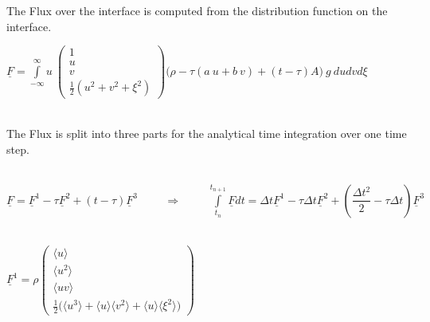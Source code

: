\documentclass[
	pdftex,             %
	12pt,				%
	a4paper,		   	%
	english,				%
	oneside,			%
]{article}
\newcommand{\mom}[1]{\langle #1 \rangle}
\newcommand{\uu}[1]{\underline{#1}}
\begin{document}
\clearpage

The Flux over the interface is computed from the distribution function on the interface. 

\begin{math}
\uu{F} = 
\int \limits_{-\infty}^{\infty}
u~
\begin{pmatrix}
	1 \\ u \\ v \\ \frac{1}{2} (u^2 + v^2 + \xi^2)
\end{pmatrix}
\Big(
	\rho - \tau (a~u + b~v) + (t-\tau)A
\Big)
~g~ du dv d\xi
\end{math}

~\\

The Flux is split into three parts for the analytical time integration over one time step. 

~\\

\begin{math}
\uu{F} = \uu{F}^1 - \tau \uu{F}^2 + (t - \tau) \uu{F}^3
\hspace{1cm} \Rightarrow \hspace{1cm}
\int \limits_{t_n}^{t_{n+1}} \uu{F} dt 
= \Delta t\uu{F}^1 
- \tau \Delta t \uu{F}^2 
+ \left( \dfrac{\Delta t^2}{2} - \tau \Delta t \right) \uu{F}^3
\end{math}

~\\

\begin{math}
\uu{F}^1 =
\rho
\begin{pmatrix}
\mom{u} \\ 
\mom{u^2} \\ 
\mom{uv} \\ 
\frac{1}{2} \big(\mom{u^3} + \mom{u}\mom{v^2} + \mom{u}\mom{\xi^2} \big)
\end{pmatrix}
\end{math}

~\\
\end{document}
